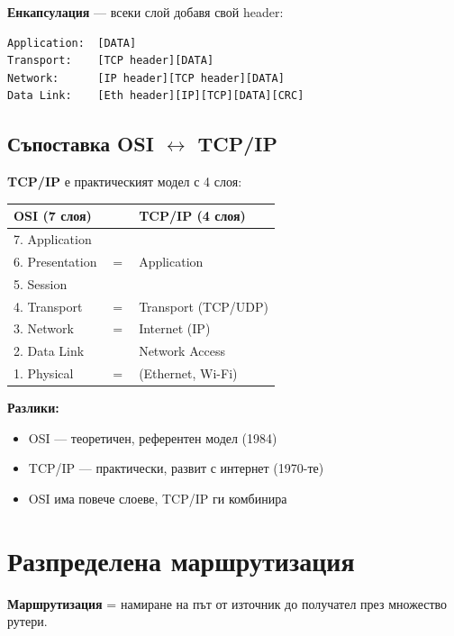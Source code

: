\documentclass[12pt,a4paper]{article}
\begin{document}
\vspace{0.5cm}

\textbf{Енкапсулация} — всеки слой добавя свой header:

\begin{lstlisting}
Application:  [DATA]
Transport:    [TCP header][DATA]
Network:      [IP header][TCP header][DATA]
Data Link:    [Eth header][IP][TCP][DATA][CRC]
\end{lstlisting}

\subsection{Съпоставка OSI $\leftrightarrow$ TCP/IP}

\textbf{TCP/IP} е практическият модел с 4 слоя:

\begin{center}
\begin{tabular}{|l|c|l|}
\hline
\textbf{OSI (7 слоя)} & & \textbf{TCP/IP (4 слоя)} \\
\hline
7. Application & & \\
6. Presentation & $=$ & Application \\
5. Session & & \\
\hline
4. Transport & $=$ & Transport (TCP/UDP) \\
\hline
3. Network & $=$ & Internet (IP) \\
\hline
2. Data Link & & Network Access \\
1. Physical & $=$ & (Ethernet, Wi-Fi) \\
\hline
\end{tabular}
\end{center}

\vspace{0.5cm}

\textbf{Разлики:}
\begin{itemize}
    \item OSI — теоретичен, референтен модел (1984)
    \item TCP/IP — практически, развит с интернет (1970-те)
    \item OSI има повече слоеве, TCP/IP ги комбинира
\end{itemize}

\newpage
\section{Разпределена маршрутизация}

\textbf{Маршрутизация} = намиране на път от източник до получател през множество рутери.
\end{document}
